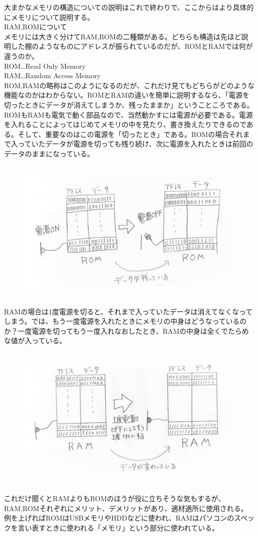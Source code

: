 大まかなメモリの構造についての説明はこれで終わりで、ここからはより具体的にメモリについて説明する。\\
RAM,ROMについて　\\
メモリには大きく分けてRAM,ROMの二種類がある。どちらも構造は先ほど説明した棚のようなものにアドレスが振られているのだが、ROMとRAMでは何が違うのか。\\
ROM…Read Only Memory\\
RAM…Random Access Memory\\
ROM,RAMの略称はこのようになるのだが、これだけ見てもどちらがどのような機能なのかはわからない。ROMとRAMの違いを簡単に説明するなら、「電源を切ったときにデータが消えてしまうか、残ったままか」ということころである。ROMもRAMも電気で動く部品なので、当然動かすには電源が必要である。電源を入れることによってはじめてメモリの中を見たり、書き換えたりできるのである。そして、重要なのはこの電源を「切ったとき」である。ROMの場合それまで入っていたデータが電源を切っても残り続け、次に電源を入れたときは前回のデータのままになっている。\\
\begin{figure}[H]
  \centering
  \includegraphics[height=7cm]{honda/image/6.jpeg}
\end{figure}
RAMの場合は1度電源を切ると、それまで入っていたデータは消えてなくなってしまう。では、もう一度電源を入れたときにメモリの中身はどうなっているのか？一度電源を切ってもう一度入れなおしたとき、RAMの中身は全くでたらめな値が入っている。
\begin{figure}[H]
  \centering
  \includegraphics[height=7cm]{honda/image/7.jpg}
\end{figure}
これだけ聞くとRAMよりもROMのほうが役に立ちそうな気もするが、RAM,ROMそれぞれにメリット、デメリットがあり、適材適所に使用される。例を上げればROMはUSBメモリやHDDなどに使われ、RAMはパソコンのスペックを言い表すときに使われる「メモリ」という部分に使われている。\\

